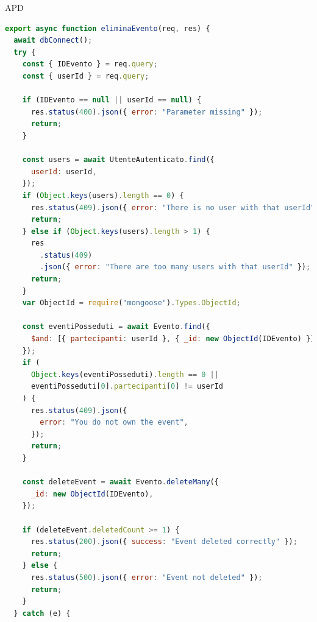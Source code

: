 \begin{listaPersonale} {APD}
\begin{listaPersonale2}[APD]{}

                \begin{lstlisting}[language=JavaScript]
export async function eliminaEvento(req, res) {
  await dbConnect();
  try {
    const { IDEvento } = req.query;
    const { userId } = req.query;

    if (IDEvento == null || userId == null) {
      res.status(400).json({ error: "Parameter missing" });
      return;
    }

    const users = await UtenteAutenticato.find({
      userId: userId,
    });
    if (Object.keys(users).length == 0) {
      res.status(409).json({ error: "There is no user with that userId" });
      return;
    } else if (Object.keys(users).length > 1) {
      res
        .status(409)
        .json({ error: "There are too many users with that userId" });
      return;
    }
    var ObjectId = require("mongoose").Types.ObjectId;

    const eventiPosseduti = await Evento.find({
      $and: [{ partecipanti: userId }, { _id: new ObjectId(IDEvento) }],
    });
    if (
      Object.keys(eventiPosseduti).length == 0 ||
      eventiPosseduti[0].partecipanti[0] != userId
    ) {
      res.status(409).json({
        error: "You do not own the event",
      });
      return;
    }

    const deleteEvent = await Evento.deleteMany({
      _id: new ObjectId(IDEvento),
    });

    if (deleteEvent.deletedCount >= 1) {
      res.status(200).json({ success: "Event deleted correctly" });
      return;
    } else {
      res.status(500).json({ error: "Event not deleted" });
      return;
    }
  } catch (e) {
    

\end{lstlisting}
\end{listaPersonale2}
\end{listaPersonale}
